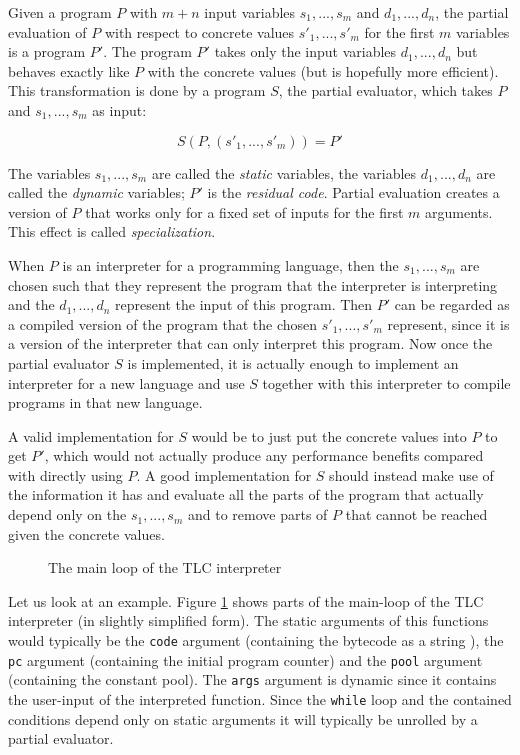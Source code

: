 Given a program $P$ with $m + n$ input variables $s_1, ..., s_m$ and $d_1, ...,
d_n$, the partial evaluation of $P$ with respect to concrete values $s'_1, ...,
s'_m$ for the first $m$ variables is a program $P'$. The program $P'$ takes only
the input variables $d_1, ..., d_n$ but behaves exactly like $P$ with the
concrete values (but is hopefully more efficient). This transformation is done
by a program $S$, the partial evaluator, which takes $P$ and $s_1, ..., s_m$ as
input:

    $$S(P, (s'_1, ..., s'_m)) = P'$$

The variables $s_1, ..., s_m$ are called the \emph{static} variables, the
variables $d_1, ..., d_n$ are called the \emph{dynamic} variables; $P'$ is the
\emph{residual code}. Partial evaluation creates a version of $P$ that works
only for a fixed set of inputs for the first $m$ arguments. This effect is
called \emph{specialization}.

When $P$ is an interpreter for a programming language, then the $s_1, ..., s_m$
are chosen such that they represent the program that the interpreter is
interpreting and the $d_1, ..., d_n$ represent the input of this program. Then
$P'$ can be regarded as a compiled version of the program that the chosen $s'_1,
..., s'_m$ represent, since it is a version of the interpreter that can only
interpret this program. Now once the partial evaluator $S$ is implemented, it is
actually enough to implement an interpreter for a new language and use $S$
together with this interpreter to compile programs in that new language.

A valid implementation for $S$ would be to just put the concrete values into $P$
to get $P'$, which would not actually produce any performance benefits compared with
directly using $P$. A good implementation for $S$ should instead make use of the
information it has and evaluate all the parts of the program that actually
depend only on the $s_1, ..., s_m$ and to remove parts of $P$ that cannot be
reached given the concrete values.

\begin{figure}[h]
\label{fig:tlc-main}
\begin{center}

\caption{The main loop of the TLC interpreter}
\end{center}
\end{figure}

Let us look at an example. Figure \ref{fig:tlc-main} shows parts of the
main-loop of the TLC interpreter (in slightly simplified form). The static
arguments of this functions would typically be the \lstinline{code} argument
(containing the bytecode as a string ), the \lstinline{pc} argument (containing
the initial program counter) and the \lstinline{pool} argument (containing the
constant pool). The \lstinline{args} argument is dynamic since it contains the
user-input of the interpreted function. Since the \lstinline{while} loop and the
contained conditions depend only on static arguments it will typically be
unrolled by a partial evaluator.

